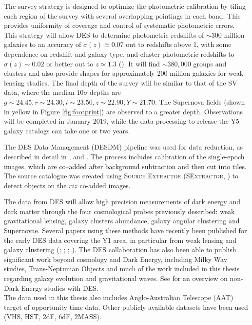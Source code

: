 The survey strategy is designed to optimize the photometric calibration by tiling each region of the survey with several overlapping pointings in each band. This provides uniformity of coverage and control of systematic photometric errors. This strategy will allow DES to determine photometric redshifts of $\sim 300$ million galaxies to an accuracy of $\sigma(z) \simeq 0.07 $ out to redshifts above 1, with some dependence on redshift and galaxy type, and cluster photometric redshifts to $\sigma(z) \sim 0.02$ or better out to $z \simeq 1.3$ (\citealt{descollaboration}). It will find $\sim 380,000$ groups and clusters and also provide shapes for approximately 200 million galaxies for weak lensing studies. The final depth of the survey will be similar to that of the SV data, where the median $10\sigma$ depths are $g\sim24.45, r\sim24.30,i\sim23.50,z\sim22.90, Y\sim21.70$. The Supernova fields (shown in yellow in Figure \ref{fig:footprint}) are observed to a greater depth. Observations will be completed in January 2019, while the data processing to release the Y5 galaxy catalogs can take one or two years.

The DES Data Management (DESDM) pipeline was used for data reduction, as described in detail in \citet{sevilla}, \citet{desai} and \citet{dataproc}. The process includes calibration of the single-epoch images, which are co--added after background subtraction and then cut into tiles. The source catalogue was created using \textsc{Source Extractor (SExtractor}, \citealt{sextractor}) to detect objects on the $riz$ co-added images. 

The data from DES will allow high precision measurements of dark energy and dark matter through the four cosmological probes previously described: weak gravitational lensing, galaxy clusters abundance, galaxy angular clustering and Supernovae. Several papers using these methods have recently been published for the early DES data covering the Y1 area, in particular from weak lensing and galaxy clustering (\citealt{Y1key}; \citealt{gruencosmo}; \citealt{DESBAO}; \citealt{DESH0}). The DES collaboration has also been able to publish significant work beyond cosmology and Dark Energy, including Milky Way studies, Trans-Neptunian Objects and much of the work included in this thesis regarding galaxy evolution and gravitational waves. See \citet{nonDE} for an overview on non-Dark Energy studies with DES.\\

The data used in this thesis also includes Anglo-Australian Telescope (AAT) target of opportunity time data. Other publicly available datasets have been used (VHS, HST, 2dF, 6dF, 2MASS).

